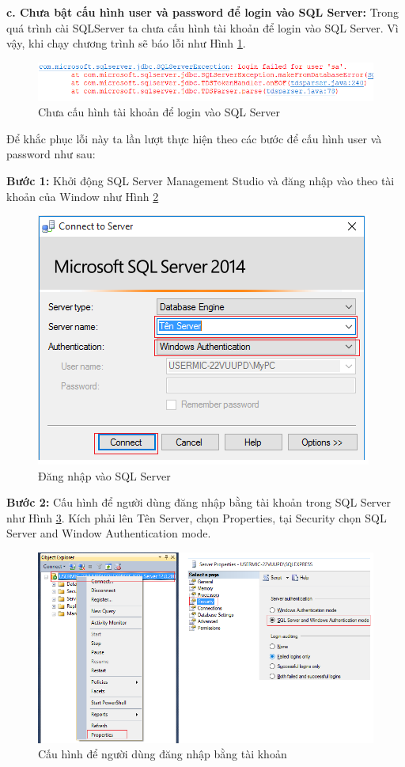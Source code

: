  \textbf{c. Chưa bật cấu hình user và password để login vào SQL Server:} Trong quá trình cài SQLServer ta chưa cấu hình tài khoản để login vào SQL Server. Vì vậy, khi chạy  chương trình sẽ báo lỗi như Hình \ref{hinh33_6}.
 
 	\begin{figure}[!ht]
 	\centering
 	\includegraphics[scale=0.7]{Figures//Hinh33_6.png}
 	\caption{ Chưa cấu hình tài khoản để login vào SQL Server  }\label{hinh33_6} 
 \end{figure}

Để khắc phục lỗi này ta lần lượt thực hiện theo các bước để cấu hình user và password như sau:

\textbf{Bước 1:} Khởi động SQL Server Management Studio và đăng nhập vào theo tài khoản của Window như Hình \ref{hinh33_7}
	\begin{figure}[!ht]
	\centering
	\includegraphics[scale=0.7]{Figures//Hinh33_7.png}
	\caption{Đăng nhập vào SQL Server  }\label{hinh33_7} 
  \end{figure}

\textbf{Bước 2:} Cấu hình để người dùng đăng nhập bằng tài khoản trong SQL Server như Hình \ref{hinh33_8}. Kích phải lên Tên Server, chọn Properties, tại Security chọn SQL Server and Window Authentication mode.  

\begin{figure}[!ht]
	\centering
	\includegraphics[scale=0.6]{Figures//Hinh33_8.png}
	\caption{Cấu hình để người dùng đăng nhập bằng tài khoản  }\label{hinh33_8} 
\end{figure}
 
